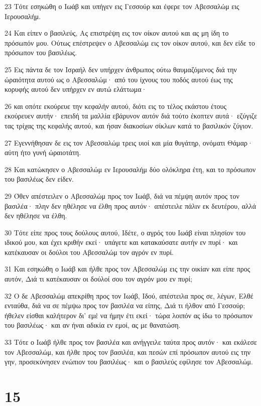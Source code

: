 \par 23 Τότε εσηκώθη ο Ιωάβ και υπήγεν εις Γεσσούρ και έφερε τον Αβεσσαλώμ εις Ιερουσαλήμ.
\par 24 Και είπεν ο βασιλεύς, Ας επιστρέψη εις τον οίκον αυτού και ας μη ίδη το πρόσωπόν μου. Ούτως επέστρεψεν ο Αβεσσαλώμ εις τον οίκον αυτού, και δεν είδε το πρόσωπον του βασιλέως.
\par 25 Εις πάντα δε τον Ισραήλ δεν υπήρχεν άνθρωπος ούτω θαυμαζόμενος διά την ώραιότητα αυτού ως ο Αβεσσαλώμ· από του ίχνους του ποδός αυτού έως της κορυφής αυτού δεν υπήρχεν εν αυτώ ελάττωμα·
\par 26 και οπότε εκούρευε την κεφαλήν αυτού, διότι εις το τέλος εκάστου έτους εκούρευεν αυτήν· επειδή τα μαλλία εβάρυνον αυτόν διά τούτο έκοπτεν αυτά· εζύγιζε τας τρίχας της κεφαλής αυτού, και ήσαν διακοσίων σίκλων κατά το βασιλικόν ζύγιον.
\par 27 Εγεννήθησαν δε εις τον Αβεσσαλώμ τρεις υιοί και μία θυγάτηρ, ονόματι Θάμαρ· αύτη ήτο γυνή ώραιοτάτη.
\par 28 Και κατώκησεν ο Αβεσσαλώμ εν Ιερουσαλήμ δύο ολόκληρα έτη, και το πρόσωπον του βασιλέως δεν είδεν.
\par 29 Όθεν απέστειλεν ο Αβεσσαλώμ προς τον Ιωάβ, διά να πέμψη αυτόν προς τον βασιλέα· πλην δεν ηθέλησε να έλθη προς αυτόν· απέστειλε πάλιν εκ δευτέρου, αλλά δεν ηθέλησε να έλθη.
\par 30 Τότε είπε προς τους δούλους αυτού, Ιδέτε, ο αγρός του Ιωάβ είναι πλησίον του ιδικού μου, και έχει κριθήν εκεί· υπάγετε και κατακαύσατε αυτήν εν πυρί· και κατέκαυσαν οι δούλοι του Αβεσσαλώμ τον αγρόν εν πυρί.
\par 31 Και εσηκώθη ο Ιωάβ και ήλθε προς τον Αβεσσαλώμ εις την οικίαν και είπε προς αυτόν, Διά τι κατέκαυσαν οι δούλοί σου τον αγρόν μου εν πυρί;
\par 32 Ο δε Αβεσσαλώμ απεκρίθη προς τον Ιωάβ, Ιδού, απέστειλα προς σε, λέγων, Ελθέ ενταύθα, διά να σε πέμψω προς τον βασιλέα να είπης, Διά τι ήλθον από Γεσσούρ; ήθελεν είσθαι καλήτερον δι' εμέ να ήμην έτι εκεί· τώρα λοιπόν ας ίδω το πρόσωπον του βασιλέως· και αν ήναι αδικία εν εμοί, ας με θανατώση.
\par 33 Τότε ο Ιωάβ ήλθε προς τον βασιλέα και ανήγγειλε ταύτα προς αυτόν· και εκάλεσε τον Αβεσσαλώμ, και ήλθε προς τον βασιλέα, και πεσών επί πρόσωπον αυτού εις την γην, προσεκύνησεν ενώπιον του βασιλέως· και ο βασιλεύς εφίλησε τον Αβεσσαλώμ.

\chapter{15}

